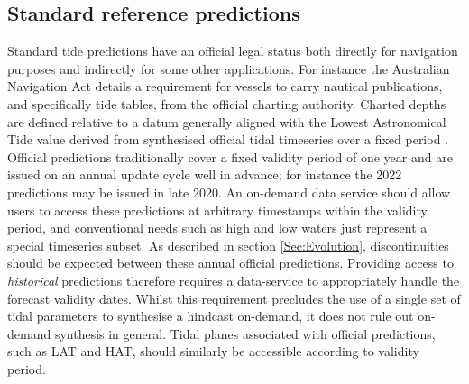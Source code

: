 \subsection{Standard reference predictions}
\label{Sec:flavour1}
Standard tide predictions have an official legal status both directly for navigation purposes and indirectly for some other applications.   
For instance the Australian Navigation Act \cite{AusNavAct2012} details a requirement for vessels to carry nautical publications, and specifically tide tables, from the official charting authority.  Charted depths are defined relative to a datum generally aligned with the Lowest Astronomical Tide value derived from synthesised official tidal timeseries over a fixed period \cite{PCTMSL-sp9}.
Official predictions traditionally cover a fixed validity period of one year and are issued on an annual update cycle well in advance; for instance the 2022 predictions may be issued in late 2020.  An on-demand data service should allow users to access these predictions at arbitrary timestamps within the validity period, and conventional needs such as high and low waters just represent a special timeseries subset.
As described in section \ref{Sec:Evolution}, discontinuities should be expected between these annual official predictions. 
Providing access to \textit{historical} predictions therefore requires a data-service to appropriately handle the forecast validity dates.  Whilst this requirement precludes the use of a single set of tidal parameters to synthesise a hindcast on-demand, it does not rule out on-demand synthesis in general.
Tidal planes associated with official predictions, such as LAT and HAT, should similarly be accessible according to validity period.


